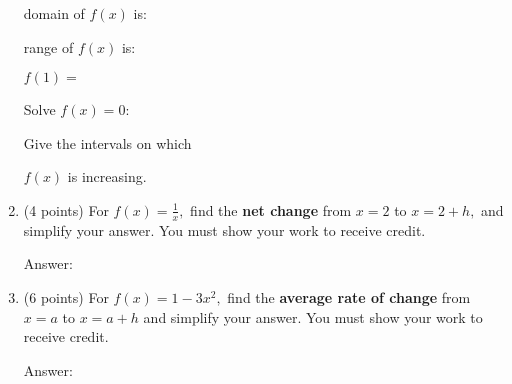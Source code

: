 \documentclass[11pt]{article}
\begin{document}
\begin{enumerate}
\vspace{-2.5in}
\begin{flushright}{domain of $f(x)$ is: \underline{\hspace{2in}}}\end{flushright}
\begin{flushright}{range of $f(x)$ is: \underline{\hspace{2in}}}\end{flushright}
\begin{flushright}{$f(1)= $\underline{\hspace{2in}}}\end{flushright}
\begin{flushright}{Solve $f(x)=0:$\underline{\hspace{2in}}}\end{flushright}

\hspace{3.25in} Give the intervals on which
\begin{flushright}{ $f(x)$ is increasing.\underline{\hspace{2in}}}\end{flushright}

\newpage
\item (4 points) For $f(x)=\frac{1}{x},$  find the {\bf{net change}} from $x=2$ to $x=2+h,$ and simplify your answer. You must show your work to receive credit.

\begin{flushright}{ Answer:\underline{\hspace{2in}}}\end{flushright}
\vfill

\item (6 points) For $f(x)=1-3x^2,$ find the {\bf{average rate of change}} from $x=a$ to $x=a+h$ and simplify your answer. You must show your work to receive credit.

\begin{flushright}{ Answer:\underline{\hspace{2in}}}\end{flushright}
\vfill



\end{enumerate}
\end{document}

